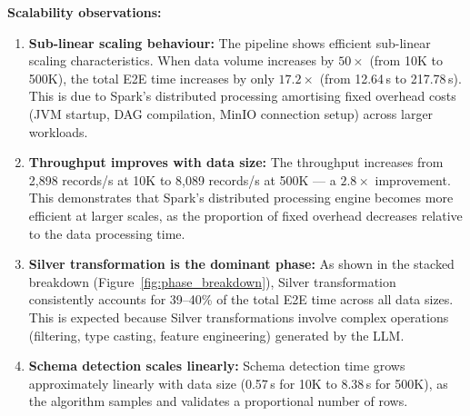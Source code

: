 \textbf{Scalability observations:}

\begin{enumerate}
\item \textbf{Sub-linear scaling behaviour:} The pipeline shows efficient sub-linear scaling characteristics. When data volume increases by $50\times$ (from 10K to 500K), the total E2E time increases by only $17.2\times$ (from 12.64\,s to 217.78\,s). This is due to Spark's distributed processing amortising fixed overhead costs (JVM startup, DAG compilation, MinIO connection setup) across larger workloads.

\item \textbf{Throughput improves with data size:} The throughput increases from 2,898 records/s at 10K to 8,089 records/s at 500K --- a $2.8\times$ improvement. This demonstrates that Spark's distributed processing engine becomes more efficient at larger scales, as the proportion of fixed overhead decreases relative to the data processing time.

\item \textbf{Silver transformation is the dominant phase:} As shown in the stacked breakdown (Figure~\ref{fig:phase_breakdown}), Silver transformation consistently accounts for 39--40\% of the total E2E time across all data sizes. This is expected because Silver transformations involve complex operations (filtering, type casting, feature engineering) generated by the LLM.

\item \textbf{Schema detection scales linearly:} Schema detection time grows approximately linearly with data size (0.57\,s for 10K to 8.38\,s for 500K), as the algorithm samples and validates a proportional number of rows.
\end{enumerate}




